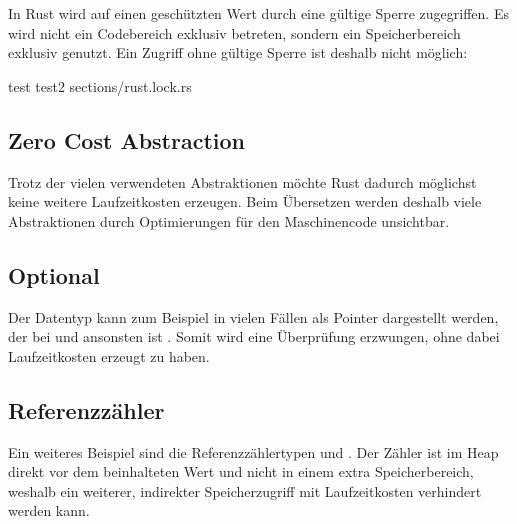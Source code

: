 In Rust wird auf einen geschützten Wert durch eine gültige Sperre zugegriffen.
Es wird nicht ein Codebereich exklusiv betreten, sondern ein Speicherbereich exklusiv genutzt.
Ein Zugriff ohne gültige Sperre ist deshalb nicht möglich:

\rustcinclude
	{test}
	{test2}
	{sections/rust.lock.rs}



\clearpage
\subsection{Zero Cost Abstraction}
\label{rust:zero_cost}

Trotz der vielen verwendeten Abstraktionen möchte Rust dadurch möglichst keine weitere Laufzeitkosten erzeugen.
Beim Übersetzen werden deshalb viele Abstraktionen durch Optimierungen für den Maschinencode unsichtbar.

\subsection{Optional}
\label{rust:zero_cost:optional}

Der  Datentyp kann zum Beispiel in vielen Fällen als Pointer dargestellt werden, der bei   und ansonsten  ist \cite[100]{rust:orly_programming}.
Somit wird eine Überprüfung erzwungen, ohne dabei Laufzeitkosten erzeugt zu haben.


\subsection{Referenzzähler}
\label{rust:zero_cost:refcounter}

Ein weiteres Beispiel sind die Referenzzählertypen  und .
Der Zähler ist im Heap direkt vor dem beinhalteten Wert und nicht in einem extra Speicherbereich, weshalb ein weiterer, indirekter Speicherzugriff mit Laufzeitkosten verhindert werden kann.


